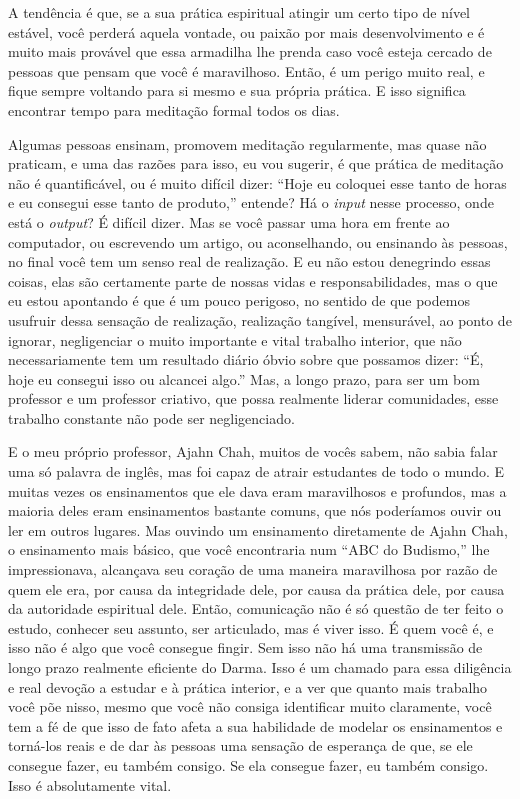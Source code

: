 A tendência é que, se a sua prática espiritual atingir um certo tipo
de nível estável, você perderá aquela vontade, ou paixão por mais
desenvolvimento e é muito mais provável que essa armadilha lhe prenda
caso você esteja cercado de pessoas que pensam que você é maravilhoso.
Então, é um perigo muito real, e fique sempre voltando para si mesmo e
sua própria prática. E isso significa encontrar tempo para meditação
formal todos os dias. 

Algumas pessoas ensinam, promovem meditação regularmente, mas quase
não praticam, e uma das razões para isso, eu vou sugerir, é que prática
de meditação não é quantificável, ou é muito difícil dizer: “Hoje eu
coloquei esse tanto de horas e eu consegui esse tanto de produto,”
entende? Há o \emph{input} nesse processo, onde está o
\emph{output}? É difícil dizer. Mas se você passar uma hora em frente
ao computador, ou escrevendo um artigo, ou aconselhando, ou ensinando
às pessoas, no final você tem um senso real de realização. E eu não
estou denegrindo essas coisas, elas são certamente parte de nossas
vidas e responsabilidades, mas o que eu estou apontando é que é um
pouco perigoso, no sentido de que podemos usufruir dessa sensação de
realização, realização tangível, mensurável, ao ponto de ignorar,
negligenciar o muito importante e vital trabalho interior, que não
necessariamente tem um resultado diário óbvio sobre que possamos dizer:
“É, hoje eu consegui isso ou alcancei algo.” Mas, a longo prazo, para
ser um bom professor e um professor criativo, que possa realmente
liderar comunidades, esse trabalho constante não pode ser
negligenciado. 

E o meu próprio professor, Ajahn Chah, muitos de vocês sabem, não
sabia falar uma só palavra de inglês, mas foi capaz de atrair
estudantes de todo o mundo. E muitas vezes os ensinamentos que ele dava
eram maravilhosos e profundos, mas a maioria deles eram ensinamentos
bastante comuns, que nós poderíamos ouvir ou ler em outros lugares. Mas
ouvindo um ensinamento diretamente de Ajahn Chah, o ensinamento mais
básico, que você encontraria num “ABC do Budismo,” lhe impressionava,
alcançava seu coração de uma maneira maravilhosa por razão de quem ele
era, por causa da integridade dele, por causa da prática dele, por
causa da autoridade espiritual dele. Então, comunicação não é só
questão de ter feito o estudo, conhecer seu assunto, ser articulado,
mas é viver isso. É quem você é, e isso não é algo que você consegue
fingir. Sem isso não há uma transmissão de longo prazo realmente
eficiente do Darma. Isso é um chamado para essa diligência e real
devoção a estudar e à prática interior, e a ver que quanto mais
trabalho você põe nisso, mesmo que você não consiga identificar muito
claramente, você tem a fé de que isso de fato afeta a sua habilidade de
modelar os ensinamentos e torná-los reais e de dar às pessoas uma
sensação de esperança de que, se ele consegue fazer, eu também consigo.
Se ela consegue fazer, eu também consigo. Isso é absolutamente vital. 

